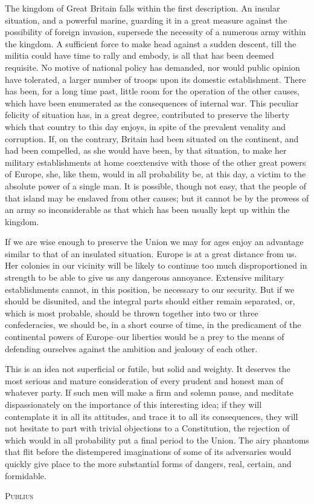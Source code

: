 The kingdom of Great Britain falls within the first description. 
An insular situation, and a powerful marine, guarding it in a great measure against the possibility of foreign invasion, supersede the necessity of a numerous army within the kingdom. 
A sufficient force to make head against a sudden descent, till the militia could have time to rally and embody, is all that has been deemed requisite. 
No motive of national policy has demanded, nor would public opinion have tolerated, a larger number of troops upon its domestic establishment. 
There has been, for a long time past, little room for the operation of the other causes, which have been enumerated as the consequences of internal war. 
This peculiar felicity of situation has, in a great degree, contributed to preserve the liberty which that country to this day enjoys, in spite of the prevalent venality and corruption. 
If, on the contrary, Britain had been situated on the continent, and had been compelled, as she would have been, by that situation, to make her military establishments at home coextensive with those of the other great powers of Europe, she, like them, would in all probability be, at this day, a victim to the absolute power of a single man. 
It is possible, though not easy, that the people of that island may be enslaved from other causes; but it cannot be by the prowess of an army so inconsiderable as that which has been usually kept up within the kingdom.

If we are wise enough to preserve the Union we may for ages enjoy an advantage similar to that of an insulated situation. 
Europe is at a great distance from us. 
Her colonies in our vicinity will be likely to continue too much disproportioned in strength to be able to give us any dangerous annoyance. 
Extensive military establishments cannot, in this position, be necessary to our security. 
But if we should be disunited, and the integral parts should either remain separated, or, which is most probable, should be thrown together into two or three confederacies, we should be, in a short course of time, in the predicament of the continental powers of Europe--our liberties would be a prey to the means of defending ourselves against the ambition and jealousy of each other.

This is an idea not superficial or futile, but solid and weighty. 
It deserves the most serious and mature consideration of every prudent and honest man of whatever party. 
If such men will make a firm and solemn pause, and meditate dispassionately on the importance of this interesting idea; if they will contemplate it in all its attitudes, and trace it to all its consequences, they will not hesitate to part with trivial objections to a Constitution, the rejection of which would in all probability put a final period to the Union. 
The airy phantoms that flit before the distempered imaginations of some of its adversaries would quickly give place to the more substantial forms of dangers, real, certain, and formidable.

\vspace{.5cm}
\textsc{Publius}

\vspace{1.5cm}

